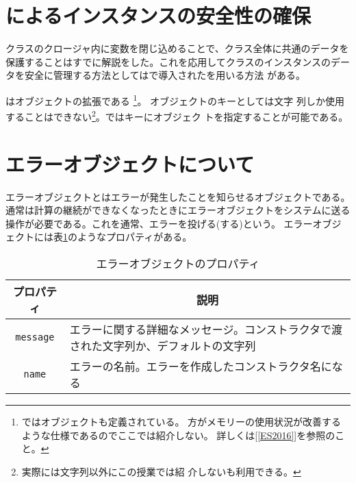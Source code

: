 \section{\protect{}によるインスタンスの安全性の確保}
クラスのクロージャ内に変数を閉じ込めることで、クラス全体に共通のデータを
保護することはすでに解説をした。これを応用してクラスのインスタンスのデー
タを安全に管理する方法としては\ES で導入されたを用いる方法
がある。

はオブジェクトの拡張である%
\footnote{\ES ではオブジェクトも定義されている。
方がメモリーの使用状況が改善するような仕様であるのでここでは紹介しない。
詳しくは[\ref{ES2016}]を参照のこと。}。
オブジェクトのキーとしては文字
列しか使用することはできない\footnote{実際には文字列以外にこの授業では紹
介しないも利用できる。}。ではキーにオブジェク
トを指定することが可能である。
 \section{エラーオブジェクトについて}
エラーオブジェクトとはエラーが発生したことを知らせるオブジェクトである。
通常は計算の継続ができなくなったときにエラーオブジェクトをシステムに送る
操作が必要である。これを通常、エラーを投げる(する)という。
エラーオブジェクトには表\ref{ErrorProp}のようなプロパティがある。
\begin{table}
 \caption{エラーオブジェクトのプロパティ}\label{ErrorProp}
 \begin{center}
	 \begin{tabular}{|c|m{}|}\hline
		プロパティ&\multicolumn{1}{c|}{説明}\\ \hline
		\texttt{message}&エラーに関する詳細なメッセージ。コンストラクタで渡
				された文字列か、デフォルトの文字列\\ \hline
		\texttt{name}&エラーの名前。エラーを作成したコンストラクタ名になる\\ \hline

	\end{tabular}
 \end{center}
\end{table}
